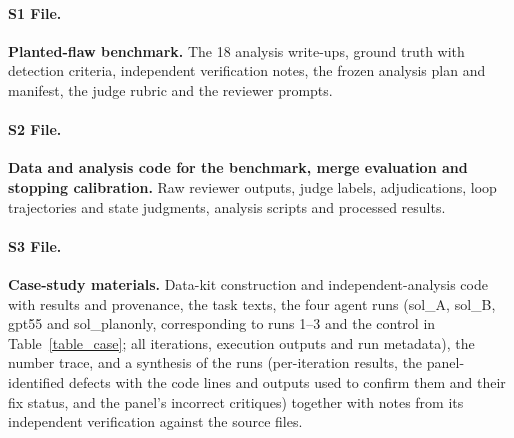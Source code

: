 \paragraph*{S1 File.}
\label{S1_File}
{\bf Planted-flaw benchmark.} The 18 analysis write-ups, ground truth with detection criteria, independent verification notes, the frozen analysis plan and manifest, the judge rubric and the reviewer prompts.

\paragraph*{S2 File.}
\label{S2_File}
{\bf Data and analysis code for the benchmark, merge evaluation and stopping calibration.} Raw reviewer outputs, judge labels, adjudications, loop trajectories and state judgments, analysis scripts and processed results.

\paragraph*{S3 File.}
\label{S3_File}
{\bf Case-study materials.} Data-kit construction and independent-analysis code with results and provenance, the task texts, the four agent runs (sol\_A, sol\_B, gpt55 and sol\_planonly, corresponding to runs 1--3 and the control in Table~\ref{table_case}; all iterations, execution outputs and run metadata), the number trace, and a synthesis of the runs (per-iteration results, the panel-identified defects with the code lines and outputs used to confirm them and their fix status, and the panel's incorrect critiques) together with notes from its independent verification against the source files.
